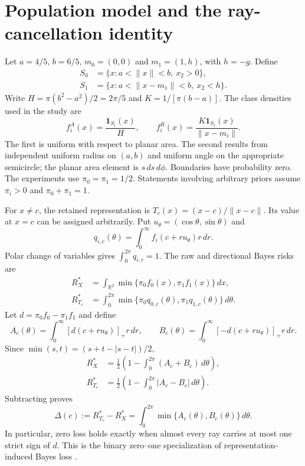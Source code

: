 \section{Population model and the ray-cancellation identity}
\label{supp:bayes}

Let $a=4/5$, $b=6/5$, $m_0=(0,0)$ and $m_1=(1,h)$, with $h=-g$. Define
\begin{align}
 S_0&=\{x:a<\|x\|<b,\ x_2>0\},\nonumber\\
 S_1&=\{x:a<\|x-m_1\|<b,\ x_2<h\}.
 \label{supp:eq:supports}
\end{align}
Write $H=\pi(b^2-a^2)/2=2\pi/5$ and $K=1/[\pi(b-a)]$. The class densities used in the study are
\begin{equation}
 f_i^A(x)=\frac{\mathbf1_{S_i}(x)}H,
 \qquad
 f_i^R(x)=\frac{K\mathbf1_{S_i}(x)}{\|x-m_i\|}.
 \label{supp:eq:densities}
\end{equation}
The first is uniform with respect to planar area. The second results from independent uniform radius on $(a,b)$ and uniform angle on the appropriate semicircle; the planar area element is $s\,ds\,d\phi$. Boundaries have probability zero. The experiments use $\pi_0=\pi_1=1/2$. Statements involving arbitrary priors assume $\pi_i>0$ and $\pi_0+\pi_1=1$.

For $x\ne c$, the retained representation is $T_c(x)=(x-c)/\|x-c\|$. Its value at $x=c$ can be assigned arbitrarily. Put $u_\theta=(\cos\theta,\sin\theta)$ and
\[
 q_{i,c}(\theta)=\int_0^\infty f_i(c+ru_\theta)r\,dr.
\]
Polar change of variables gives $\int_0^{2\pi}q_{i,c}=1$. The raw and directional Bayes risks are
\begin{align}
 R_X^*&=\int_{\mathbb R^2}\min\{\pi_0f_0(x),\pi_1f_1(x)\}\,dx,
 \label{supp:eq:raw-risk}\\
 R^*_{T_c}&=\int_0^{2\pi}\min\{\pi_0q_{0,c}(\theta),
                                  \pi_1q_{1,c}(\theta)\}\,d\theta.
 \label{supp:eq:direction-risk}
\end{align}
Let $d=\pi_0f_0-\pi_1f_1$ and define
\[
 A_c(\theta)=\int_0^\infty[d(c+ru_\theta)]_+r\,dr,
 \qquad
 B_c(\theta)=\int_0^\infty[-d(c+ru_\theta)]_+r\,dr.
\]
Since $\min(s,t)=(s+t-|s-t|)/2$,
\begin{align*}
 R_X^*&=\frac12\left(1-\int_0^{2\pi}(A_c+B_c)\,d\theta\right),\\
 R^*_{T_c}&=\frac12\left(1-\int_0^{2\pi}|A_c-B_c|\,d\theta\right).
\end{align*}
Subtracting proves
\begin{equation}
 \Delta(c):=R^*_{T_c}-R_X^*
 =\int_0^{2\pi}\min\{A_c(\theta),B_c(\theta)\}\,d\theta.
 \label{supp:eq:cancellation}
\end{equation}
In particular, zero loss holds exactly when almost every ray carries at most one strict sign of $d$. This is the binary zero--one specialization of representation-induced Bayes loss \citep{Silva2012,Silva2024}.

